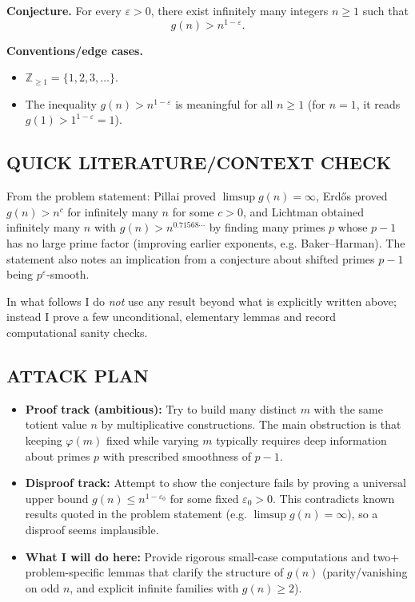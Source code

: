 \medskip
\noindent\textbf{Conjecture.} For every $\varepsilon>0$, there exist infinitely many integers $n\ge 1$ such that
\[
 g(n) > n^{1-\varepsilon}.
\]

\medskip
\noindent\textbf{Conventions/edge cases.}
\begin{itemize}
\item $\mathbb{Z}_{\ge 1}=\{1,2,3,\dots\}$.
\item The inequality $g(n) > n^{1-\varepsilon}$ is meaningful for all $n\ge 1$ (for $n=1$, it reads $g(1)>1^{1-\varepsilon}=1$).
\end{itemize}

\subsection*{QUICK LITERATURE/CONTEXT CHECK}
From the problem statement: Pillai proved $\limsup g(n)=\infty$, Erd\H{o}s proved $g(n)>n^c$ for infinitely many $n$ for some $c>0$, and Lichtman obtained infinitely many $n$ with $g(n)>n^{0.71568\cdots}$ by finding many primes $p$ whose $p-1$ has no large prime factor (improving earlier exponents, e.g. Baker--Harman). The statement also notes an implication from a conjecture about shifted primes $p-1$ being $p^{\varepsilon}$-smooth.

In what follows I do \emph{not} use any result beyond what is explicitly written above; instead I prove a few unconditional, elementary lemmas and record computational sanity checks.

\subsection*{ATTACK PLAN}
\begin{itemize}
\item \textbf{Proof track (ambitious):} Try to build many distinct $m$ with the same totient value $n$ by multiplicative constructions. The main obstruction is that keeping $\varphi(m)$ fixed while varying $m$ typically requires deep information about primes $p$ with prescribed smoothness of $p-1$.
\item \textbf{Disproof track:} Attempt to show the conjecture fails by proving a universal upper bound $g(n) \le n^{1-\varepsilon_0}$ for some fixed $\varepsilon_0>0$. This contradicts known results quoted in the problem statement (e.g. $\limsup g(n)=\infty$), so a disproof seems implausible.
\item \textbf{What I will do here:} Provide rigorous small-case computations and two+ problem-specific lemmas that clarify the structure of $g(n)$ (parity/vanishing on odd $n$, and explicit infinite families with $g(n)\ge 2$).
\end{itemize}


